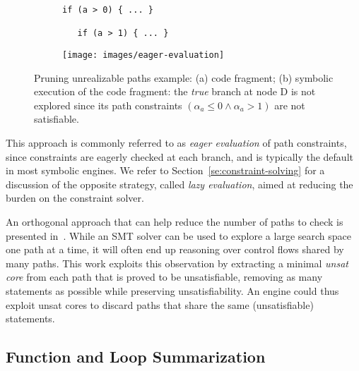 \begin{figure}[t]
  \begin{subfigure}{.29\textwidth}
    \vspace{0mm}
    \begin{lstlisting}[basicstyle=\ttfamily\scriptsize]
   if (a > 0) { ... } 

   if (a > 1) { ... }
    \end{lstlisting}
    \vspace{4.99mm}
    \caption{}
  \end{subfigure}%
  \begin{subfigure}{.70\textwidth}
    \centering
    \texttt{[image: images/eager-evaluation]} 
    \vspace{-6mm}
    \caption{}
  \end{subfigure}%
  \vspace{-2mm}
  \caption{Pruning unrealizable paths example: (a) code fragment; (b) symbolic execution of the code fragment: the {\em true} branch at node D is not explored since its path constraints $(\alpha_a \leq 0 \wedge \alpha_a > 1)$ are not satisfiable.}
  \label{fig:eager-evaluation}
\end{figure}

This approach is commonly referred to as {\em eager evaluation} of path constraints, since constraints are eagerly checked at each branch, and is typically the default in most symbolic engines. We refer to Section~\ref{se:constraint-solving} for a discussion of the opposite strategy, called {\em lazy evaluation}, aimed at reducing the burden on the constraint solver.

An orthogonal approach that can help reduce the number of paths to check is presented in~\cite{SSJ-NFM15}. While an SMT solver can be used to explore a large search space one path at a time, it will often end up reasoning over control flows shared by many paths. This work exploits this observation by extracting a minimal {\em unsat core} from each path that is proved to be unsatisfiable,
removing as many statements as possible while preserving unsatisfiability. An engine could thus exploit unsat cores to discard paths that share the same (unsatisfiable) statements.

\subsection{Function and Loop Summarization} 
\label{ss:summarization}

